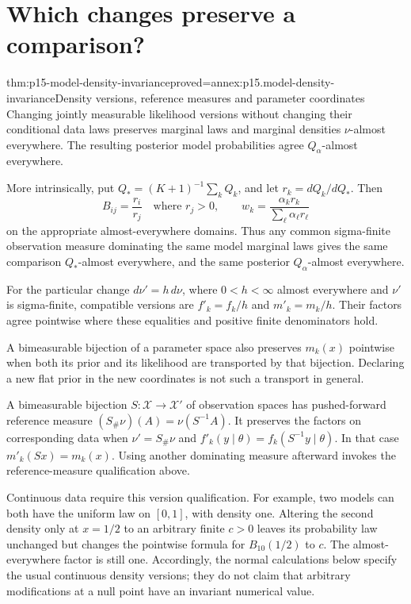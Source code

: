 \section{Which changes preserve a comparison?}
\label{sec:p15-model-density-invariance}

\begin{hbtheorem}{thm:p15-model-density-invariance}{proved=annex:p15.model-density-invariance}{Density versions, reference measures and parameter coordinates}
Changing jointly measurable likelihood versions without changing their
conditional data laws preserves marginal laws and marginal densities
\(\nu\)-almost everywhere. The resulting posterior model probabilities
agree \(Q_\alpha\)-almost everywhere.

More intrinsically, put \(Q_*=(K+1)^{-1}\sum_kQ_k\), and let
\(r_k=dQ_k/dQ_*\). Then
\[
 B_{ij}=\frac{r_i}{r_j}\quad\text{where }r_j>0,
 \qquad
 w_k=\frac{\alpha_kr_k}{\sum_\ell\alpha_\ell r_\ell}
\]
on the appropriate almost-everywhere domains. Thus any common sigma-finite
observation measure dominating the same model marginal laws gives the same
comparison \(Q_*\)-almost everywhere, and the same posterior
\(Q_\alpha\)-almost everywhere.

For the particular change \(d\nu'=h\,d\nu\), where \(0<h<\infty\)
almost everywhere and \(\nu'\) is sigma-finite, compatible versions are
\(f'_k=f_k/h\) and \(m'_k=m_k/h\). Their factors agree pointwise where
these equalities and positive finite denominators hold.

A bimeasurable bijection of a parameter space also preserves \(m_k(x)\)
pointwise when both its prior and its likelihood are transported by that
bijection. Declaring a new flat prior in the new coordinates is not such
a transport in general.

A bimeasurable bijection \(S:\mathcal X\to\mathcal X'\) of observation
spaces has pushed-forward reference measure
\((S_\#\nu)(A)=\nu(S^{-1}A)\). It preserves the factors on corresponding
data when \(\nu'=S_\#\nu\)
and \(f'_k(y\mid\theta)=f_k(S^{-1}y\mid\theta)\). In that case
\(m'_k(Sx)=m_k(x)\). Using another dominating measure afterward invokes
the reference-measure qualification above.
\end{hbtheorem}

Continuous data require this version qualification. For example, two models
can both have the uniform law on \([0,1]\), with density one. Altering the
second density only at \(x=1/2\) to an arbitrary finite \(c>0\) leaves
its probability law unchanged but changes the pointwise formula for
\(B_{10}(1/2)\) to \(c\). The almost-everywhere factor is still one.
Accordingly, the normal calculations below specify the usual continuous
density versions; they do not claim that arbitrary modifications at a null
point have an invariant numerical value.

